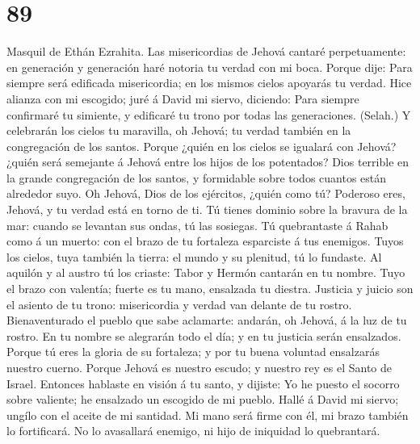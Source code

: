 \hypertarget{section-88}{%
\section{89}\label{section-88}}

 Masquil de Ethán Ezrahita. Las misericordias de Jehová
cantaré perpetuamente: en generación y generación haré notoria tu verdad
con mi boca.  Porque dije: Para siempre será edificada
misericordia; en los mismos cielos apoyarás tu verdad. 
Hice alianza con mi escogido; juré á David mi siervo, diciendo:
 Para siempre confirmaré tu simiente, y edificaré tu trono
por todas las generaciones. (Selah.)  Y celebrarán los
cielos tu maravilla, oh Jehová; tu verdad también en la congregación de
los santos.  Porque ¿quién en los cielos se igualará con
Jehová? ¿quién será semejante á Jehová entre los hijos de los
potentados?  Dios terrible en la grande congregación de
los santos, y formidable sobre todos cuantos están alrededor suyo.
 Oh Jehová, Dios de los ejércitos, ¿quién como tú?
Poderoso eres, Jehová, y tu verdad está en torno de ti. 
Tú tienes dominio sobre la bravura de la mar: cuando se levantan sus
ondas, tú las sosiegas.  Tú quebrantaste á Rahab como á
un muerto: con el brazo de tu fortaleza esparciste á tus enemigos.
 Tuyos los cielos, tuya también la tierra: el mundo y su
plenitud, tú lo fundaste.  Al aquilón y al austro tú los
criaste: Tabor y Hermón cantarán en tu nombre.  Tuyo el
brazo con valentía; fuerte es tu mano, ensalzada tu diestra.
 Justicia y juicio son el asiento de tu trono:
misericordia y verdad van delante de tu rostro. 
Bienaventurado el pueblo que sabe aclamarte: andarán, oh Jehová, á la
luz de tu rostro.  En tu nombre se alegrarán todo el día;
y en tu justicia serán ensalzados.  Porque tú eres la
gloria de su fortaleza; y por tu buena voluntad ensalzarás nuestro
cuerno.  Porque Jehová es nuestro escudo; y nuestro rey
es el Santo de Israel.  Entonces hablaste en visión á tu
santo, y dijiste: Yo he puesto el socorro sobre valiente; he ensalzado
un escogido de mi pueblo.  Hallé á David mi siervo;
ungílo con el aceite de mi santidad.  Mi mano será firme
con él, mi brazo también lo fortificará.  No lo
avasallará enemigo, ni hijo de iniquidad lo quebrantará. 

